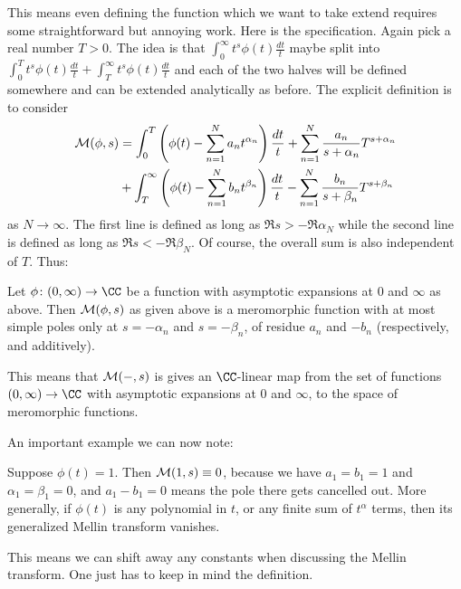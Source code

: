 This means even defining the function
which we want to take extend requires some straightforward
but annoying work.
Here is the specification.
Again pick a real number $T > 0$.
The idea is that
$\int_0^\infty t^s \phi(t) \frac{dt}{t}$
maybe split into
$\int_0^T t^s \phi(t) \frac{dt}{t}
+ \int_T^\infty t^s \phi(t) \frac{dt}{t}$
and each of the two halves will be defined somewhere
and can be extended analytically as before.
The explicit definition is to consider
\begin{align*}
  \mathcal M(\phi, s) &=
  \int_0^T \left( \phi(t)
    - \sum_{n=1}^N a_n t^{\alpha_n} \right) \frac{dt}{t}
    + \sum_{n=1}^N \frac{a_n}{s+\alpha_n} T^{s+\alpha_n} \\
  &+   \int_T^\infty \left( \phi(t)
    - \sum_{n=1}^N b_n t^{\beta_n} \right) \frac{dt}{t}
    - \sum_{n=1}^N \frac{b_n}{s+\beta_n} T^{s+\beta_n}
\end{align*}
as $N \to \infty$.
The first line is defined
as long as $\Re s > - \Re \alpha_N$
while the second line is defined
as long as $\Re s < - \Re \beta_N$.
Of course, the overall sum is also independent of $T$.
Thus:
\begin{theorem}
  Let $\phi \colon (0,\infty) \to \CC$ be a function
  with asymptotic expansions at $0$ and $\infty$ as above.
  Then $\mathcal M(\phi, s)$ as given above
  is a meromorphic function
  with at most simple poles only at $s = -\alpha_n$ and $s = -\beta_n$,
  of residue $a_n$ and $-b_n$ (respectively, and additively).
\end{theorem}

This means that $\mathcal M(-,s)$ is gives an $\CC$-linear map
from the set of functions $(0,\infty) \to \CC$
with asymptotic expansions at $0$ and $\infty$,
to the space of meromorphic functions.

An important example we can now note:
\begin{example}
  Suppose $\phi(t) = 1$.
  Then $\mathcal M(1, s) \equiv 0$, because we have $a_1 = b_1 = 1$
  and $\alpha_1 = \beta_1 = 0$, and $a_1 - b_1 = 0$
  means the pole there gets cancelled out.
  More generally, if $\phi(t)$ is any polynomial in $t$,
  or any finite sum of $t^\alpha$ terms,
  then its generalized Mellin transform vanishes.
\end{example}
This means we can shift away any constants when discussing
the Mellin transform.
One just has to keep in mind the definition.

